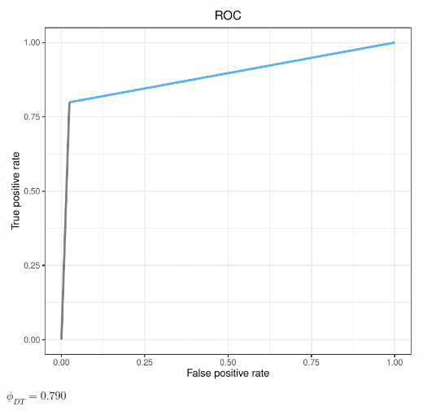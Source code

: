 \documentclass[compress]{beamer}
\begin{document}
\begin{frame}
\begin{columns}
\begin{center}
\includegraphics[width=0.5\linewidth]{Pic/Decision_Tree_FINAL_ROC.pdf}\\
$\phi_{DT}=0.790$
\end{center}
\end{columns}
\end{frame}
\end{document}
